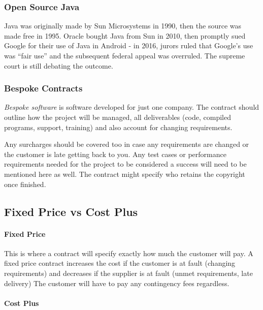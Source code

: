 \subsubsection{Open Source Java}\label{ssub:open_source_java}

Java was originally made by Sun Microsystems in 1990, then the source was made free in 1995.
Oracle bought Java from Sun in 2010, then promptly sued Google for their use of Java in Android - in 2016, jurors ruled that Google's use was ``fair use'' and the subsequent federal appeal was overruled.
The supreme court is still debating the outcome.

\subsubsection{Bespoke Contracts}\label{ssub:bespoke_contracts}

\emph{Bespoke software} is software developed for just one company.
The contract should outline how the project will be managed, all deliverables (code, compiled programs, support, training) and also account for changing requirements.

Any surcharges should be covered too in case any requirements are changed or the customer is late getting back to you.
Any test cases or performance requirements needed for the project to be considered a success will need to be mentioned here as well.
The contract might specify who retains the copyright once finished.

\subsection{Fixed Price vs Cost Plus}\label{sub:fixed_price_vs_cost_plus}

\paragraph{Fixed Price}\label{par:fixed_price}

This is where a contract will specify exactly how much the customer will pay.
A fixed price contract increases the cost if the customer is at fault (changing requirements) and decreases if the supplier is at fault (unmet requirements, late delivery)
The customer will have to pay any contingency fees regardless.

\paragraph{Cost Plus}\label{par:cost_plus}

